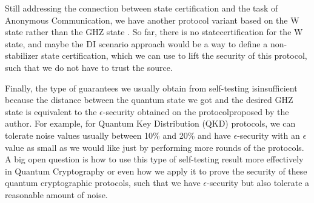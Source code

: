 \documentclass[12pt]{article}
\begin{document}
    \noindent Still addressing the connection between state certification and the task of Anonymous Communication, we have another protocol variant based on the W state \cite{dur-vidal-cirac:three-qubits-entangled-two-inequivalent-ways:2000:02-2024} rather than the GHZ state \cite{lipinska-murta-wehner:anonymous-transmission-noisy-quantum-network-using-w-state:2018:02-2024}. So far, there is no state\break certification for the W state, and maybe the DI scenario approach would be a way to define a non-stabilizer state certification, which we can use to lift the security of this protocol, such that we do not have to trust the source.

    Finally, the type of guarantees \cite{christandl-wehner:quantum-anonymous-transmissions:2005:02-2024} we usually obtain from self-testing is\break insufficient \cite{grasselli-murta-de-jong-hahn-bruss-kampermann-pappa:secure-anonymous-conferencing-quantum-networks:2022:02-2024} because the distance between the quantum state we got and the desired GHZ state is equivalent to the $\epsilon$-security obtained on the protocol\break proposed by the author. For example, for Quantum Key Distribution (QKD) protocols, we can tolerate noise values usually between 10\% and 20\% and have $\epsilon$-security with an $\epsilon$ value as small as we would like just by performing more rounds of the protocols. A big open question is how to use this type of self-testing result more effectively in Quantum Cryptography or even how we apply it to prove the security of these quantum cryptographic protocols, such that we have $\epsilon$-security but also tolerate a reasonable amount of noise.
    
    
    

    \clearpage
    
    
    \label{bib:bibliography}
    
\end{document}
